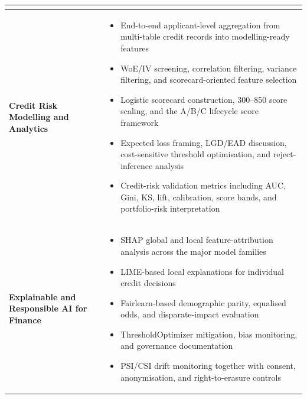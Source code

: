 \begin{table}[H]
\begin{tabular}{|p{4.2cm}|p{10.9cm}|}
\begin{itemize}[nosep]
\end{itemize}
\\
\hline
\textbf{Credit Risk Modelling and Analytics} &
\begin{itemize}[nosep]
  \item End-to-end applicant-level aggregation from multi-table credit records into modelling-ready features
  \item WoE/IV screening, correlation filtering, variance filtering, and scorecard-oriented feature selection
  \item Logistic scorecard construction, 300--850 score scaling, and the A/B/C lifecycle score framework
  \item Expected loss framing, LGD/EAD discussion, cost-sensitive threshold optimisation, and reject-inference analysis
  \item Credit-risk validation metrics including AUC, Gini, KS, lift, calibration, score bands, and portfolio-risk interpretation
\end{itemize}
\\
\hline
\textbf{Explainable and Responsible AI for Finance} &
\begin{itemize}[nosep]
  \item SHAP global and local feature-attribution analysis across the major model families
  \item LIME-based local explanations for individual credit decisions
  \item Fairlearn-based demographic parity, equalised odds, and disparate-impact evaluation
  \item ThresholdOptimizer mitigation, bias monitoring, and governance documentation
  \item PSI/CSI drift monitoring together with consent, anonymisation, and right-to-erasure controls
\end{itemize}
\\
\hline
\end{tabular}
\end{table}
